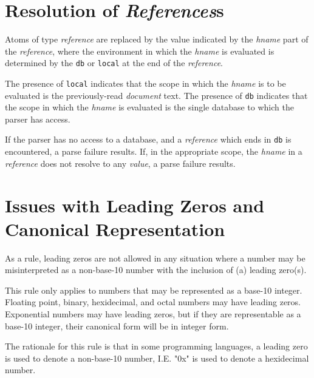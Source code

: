 \documentclass{memarticle}
\begin{document}
{        \section{Resolution of \emph{References}s}
                Atoms of type \emph{reference} are replaced
                by the value indicated by the \emph{hname} part of the \emph{reference},
                where the environment in which the \emph{hname} is evaluated is determined
                by the \texttt{db} or \texttt{local} at the end of the \emph{reference}.
                \par
                The presence of \texttt{local} indicates 
                that the scope in which the \emph{hname} is to be evaluated
                is the previously-read \emph{document} text.
                The presence of 
                \texttt{db} indicates
                that the scope in which the \emph{hname} is evaluated
                is the single database
                to which the parser has access.
                \par
                If the parser has no access to a database,
                and a \emph{reference} which ends in \texttt{db} is encountered,
                a parse failure results.
                If,
                in the appropriate scope,
                the \emph{hname} in a \emph{reference} does not resolve to any \emph{value},
                a parse failure results.
        \section{Issues with Leading Zeros and Canonical Representation}
                As a rule, leading zeros are not allowed
                in any situation where a number may be misinterpreted as a non-base-10 number
                with the inclusion of (a) leading zero(s).
                \par
                This rule only applies to numbers that may be represented as a base-10 integer.
                Floating point, binary, hexidecimal, and octal numbers may have leading zeros.
                Exponential numbers may have leading zeros, but if they are representable as a base-10 integer,
                their canonical form will be in integer form.
                \par
                The rationale for this rule is that in some programming languages,
                a leading zero is used to denote a non-base-10 number,
                I.E. "0x" is used to denote a hexidecimal number.
}   
\end{document}
